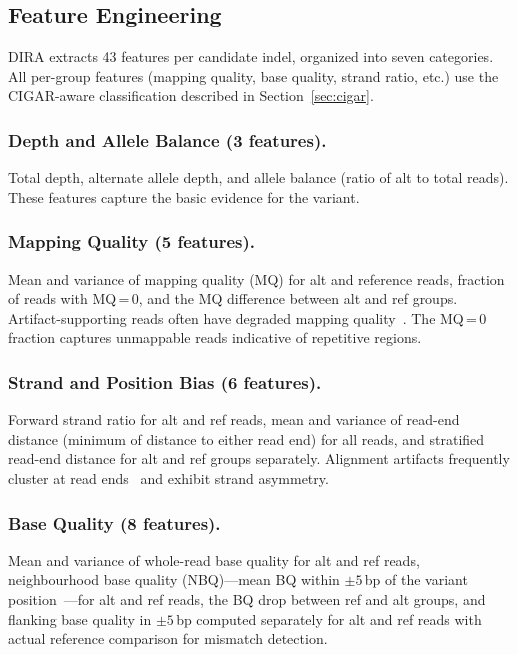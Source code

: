 \documentclass[sigconf]{acmart}
\begin{document}
\subsection{Feature Engineering}
DIRA extracts 43 features per candidate indel, organized into seven categories. All per-group features (mapping quality, base quality, strand ratio, etc.) use the CIGAR-aware classification described in Section~\ref{sec:cigar}.

\subsubsection{Depth and Allele Balance (3 features).}
Total depth, alternate allele depth, and allele balance (ratio of alt to total reads). These features capture the basic evidence for the variant.

\subsubsection{Mapping Quality (5 features).}
Mean and variance of mapping quality (MQ) for alt and reference reads, fraction of reads with MQ\,=\,0, and the MQ difference between alt and ref groups. Artifact-supporting reads often have degraded mapping quality~\cite{li2008mapping}. The MQ\,=\,0 fraction captures unmappable reads indicative of repetitive regions.

\subsubsection{Strand and Position Bias (6 features).}
Forward strand ratio for alt and ref reads, mean and variance of read-end distance (minimum of distance to either read end) for all reads, and stratified read-end distance for alt and ref groups separately. Alignment artifacts frequently cluster at read ends~\cite{freed2022dnascope} and exhibit strand asymmetry.

\subsubsection{Base Quality (8 features).}
Mean and variance of whole-read base quality for alt and ref reads, neighbourhood base quality (NBQ)---mean BQ within $\pm 5$\,bp of the variant position~\cite{challis2012atlas2}---for alt and ref reads, the BQ drop between ref and alt groups, and flanking base quality in $\pm 5$\,bp computed separately for alt and ref reads with actual reference comparison for mismatch detection.
\end{document}
